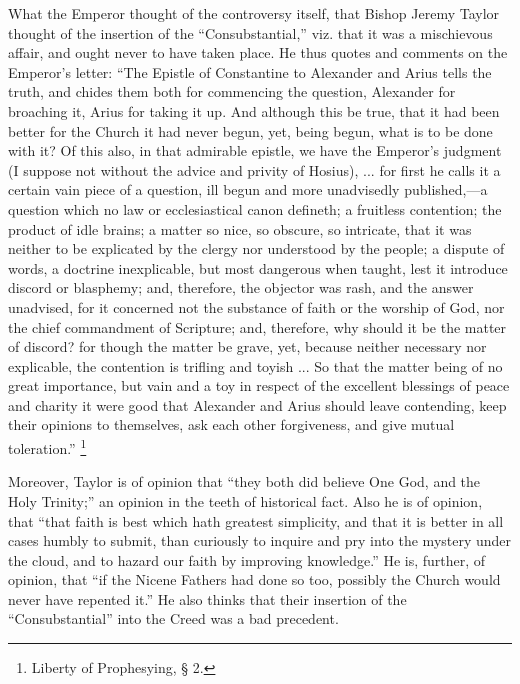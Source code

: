 What the Emperor thought of the controversy itself, that Bishop
Jeremy Taylor thought of the insertion of the
``Consubstantial,'' viz. that it was a mischievous affair, and
ought never to have taken place. He thus quotes and comments on
the Emperor's letter: ``The Epistle of Constantine to Alexander
and Arius tells the truth, and chides them both for commencing the
question, Alexander for broaching it, Arius for taking it up. And
although this be true, that it had been better for the Church it had
never begun, yet, being begun, what is to be done with it? Of this
also, in that admirable epistle, we have the Emperor's judgment (I
suppose not without the advice and privity of Hosius), ... for first
he calls it a certain vain piece of a question, ill begun and more
unadvisedly published,—a question which no law or ecclesiastical
canon defineth; a fruitless contention; the product of idle brains; a
matter so nice, so obscure, so intricate, that it was neither to be
explicated by the clergy nor understood by the people; a dispute of
words, a doctrine inexplicable, but most dangerous when taught, lest
it introduce discord or blasphemy; and, therefore, the objector was
rash, and the answer unadvised, for it concerned not the substance of
faith or the worship of God, nor the chief commandment of Scripture;
and, therefore, why should it be the matter of discord? for though the
matter be grave, yet, because neither necessary nor explicable, the
contention is trifling and toyish ... So that the matter being of no
great importance, but vain and a toy in respect of the excellent
blessings of peace and charity it were good that Alexander and Arius
should leave contending, keep their opinions to themselves, ask each
other forgiveness, and give mutual toleration.'' \footnote{Liberty of
Prophesying, § 2.}

Moreover, Taylor is of opinion that ``they both did believe One God, and the Holy Trinity;'' an opinion in the teeth
of historical fact. Also he is of opinion, that ``that faith is
best which hath greatest simplicity, and that it is better in all
cases humbly to submit, than curiously to inquire and pry into the
mystery under the cloud, and to hazard our faith by improving
knowledge.'' He is, further, of opinion, that ``if the Nicene
Fathers had done so too, possibly the Church would never have repented
it.'' He also thinks that their insertion of the
``Consubstantial'' into the Creed was a bad precedent.

